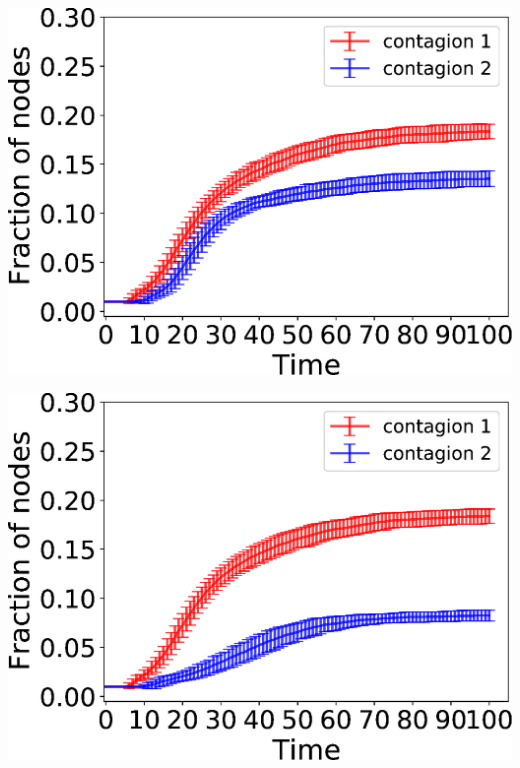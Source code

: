 \documentclass[landscape,paperwidth=70in,paperheight=46in,fontscale=0.225]{baposter} %
\begin{document}
\begin{poster}
{\begin{minipage}{0.5\linewidth}
\end{minipage}
\hfill
\begin{minipage}{0.5\linewidth}
\includegraphics[scale=0.27]{figures/danville_asym_interaction_100ns_fraction_cum_errorbar.eps} 
\end{minipage}
\vspace{5mm}
\hfill
\begin{minipage}{0.48\linewidth}
\includegraphics[scale=0.27]{figures/danville_no_interaction_100ns_fraction_cum_errorbar.eps} 
\end{minipage}
}
\end{poster}
\end{document}
